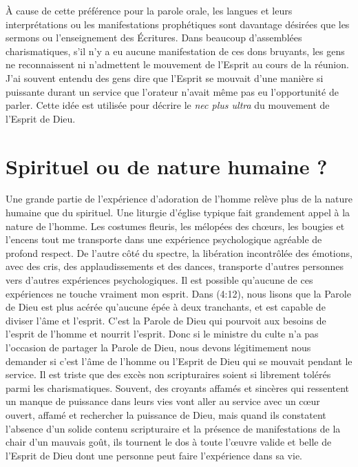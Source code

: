 À cause de cette préférence pour la parole orale, les langues
 et leurs interprétations ou les manifestations prophétiques
 sont davantage désirées que les sermons ou l'enseignement des Écritures.
 Dans beaucoup d'assemblées charismatiques, s'il n'y a eu aucune
 manifestation de ces dons bruyants, les gens ne reconnaissent ni
 n'admettent le mouvement de l'Esprit au cours de la réunion.
 J'ai souvent entendu des gens dire que l'Esprit se mouvait d'une manière
 si puissante durant un service que l'orateur n'avait même pas eu
 l'opportunité de parler. Cette idée est utilisée pour décrire le
 \emph{nec plus ultra} du mouvement de l'Esprit de Dieu.


\section*{Spirituel ou de nature humaine ?}

Une grande partie de l'expérience d'adoration de l'homme relève plus
 de la nature humaine que du spirituel.
 Une liturgie d'église typique fait grandement appel à la nature de l'homme.
 Les costumes fleuris, les mélopées des chœurs, les bougies et l'encens
 \ocadr tout me transporte dans une expérience psychologique agréable
 de profond respect. De l'autre côté du spectre, la libération incontrôlée
 des émotions, avec des cris, des applaudissements et des dances,
 transporte d'autres personnes vers d'autres expériences psychologiques.
 Il est possible qu'aucune de ces expériences ne touche vraiment mon esprit.
 Dans (4:12), nous lisons que la Parole de Dieu
 est plus acérée qu'aucune épée à deux tranchants,
 et est capable de diviser l'âme et l'esprit.
 C'est la Parole de Dieu qui pourvoit aux besoins de l'esprit de l'homme
 et nourrit l'esprit. Donc si le ministre du culte n'a pas l'occasion
 de partager la Parole de Dieu, nous devons légitimement nous demander
 si c'est l'âme de l'homme ou l'Esprit de Dieu qui se mouvait pendant
 le service. Il est triste que des excès non scripturaires soient si
 librement tolérés parmi les charismatiques.
 Souvent, des croyants affamés et sincères qui ressentent un manque
 de puissance dans leurs vies vont aller au service avec un cœur ouvert,
 affamé et rechercher la puissance de Dieu, mais quand ils constatent
 l'absence d'un solide contenu scripturaire et la présence
 de manifestations de la chair d'un mauvais goût, ils tournent le dos
 à toute l'œuvre valide et belle de l'Esprit de Dieu dont une personne
 peut faire l'expérience dans sa vie.


